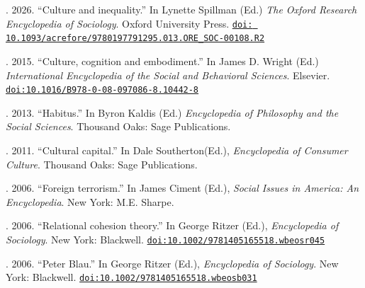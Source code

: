
. 2026. ``Culture and inequality.'' In Lynette Spillman (Ed.) {\em The Oxford Research Encyclopedia of Sociology}. Oxford University Press. \href{https://doi.org/10.1093/acrefore/9780197791295.013.ORE_SOC-00108.R2}{\nolinkurl{doi: 10.1093/acrefore/9780197791295.013.ORE_SOC-00108.R2}} 

. 2015. ``Culture, cognition and embodiment.'' In James D. Wright (Ed.) {\em International Encyclopedia of the Social and Behavioral Sciences}. Elsevier. \href{https://doi.org/10.1016/B978-0-08-097086-8.10442-8}{\nolinkurl{doi:10.1016/B978-0-08-097086-8.10442-8}}

. 2013. ``Habitus.''  In Byron Kaldis (Ed.) {\em Encyclopedia of Philosophy and the Social Sciences}. Thousand Oaks: Sage Publications. 

. 2011. ``Cultural capital.''  In Dale Southerton(Ed.), {\em Encyclopedia of Consumer Culture}.  Thousand Oaks: Sage Publications. 

. 2006. ``Foreign terrorism.'' In James Ciment (Ed.), {\em Social Issues in America: An Encyclopedia}. New York: M.E. Sharpe. 

. 2006. ``Relational cohesion theory.'' In George Ritzer (Ed.), {\em Encyclopedia of Sociology}. New York: Blackwell. \href{https://doi.org/10.1002/9781405165518.wbeosr045}{\nolinkurl{doi:10.1002/9781405165518.wbeosr045}}

. 2006. ``Peter Blau.'' In George Ritzer (Ed.), {\em Encyclopedia of Sociology}. New York: Blackwell.  \href{https://doi.org/10.1002/9781405165518.wbeosb031}{\nolinkurl{doi:10.1002/9781405165518.wbeosb031}}
